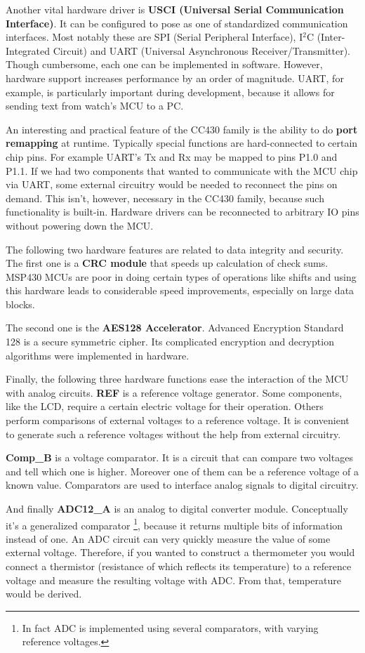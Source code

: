Another vital hardware driver is {\bf USCI (Universal Serial
Communication Interface)}. It can be configured to pose as one of
standardized communication interfaces. Most notably these are SPI
(Serial Peripheral Interface), I$^2$C (Inter-Integrated Circuit) and
UART (Universal Asynchronous Receiver/Transmitter). Though cumbersome,
each one can be implemented in software. However, hardware support
increases performance by an order of magnitude. UART, for example, is
particularly important during development, because it allows for sending
text from watch's MCU to a PC.

An interesting and practical feature of the CC430 family is the
ability to do {\bf port remapping} at runtime. Typically special
functions are hard-connected to certain chip pins. For example UART's
Tx and Rx may be mapped to pins P1.0 and P1.1. If we had two
components that wanted to communicate with the MCU chip via UART, some
external circuitry would be needed to reconnect the pins on demand.
This isn't, however, necessary in the CC430 family, because such
functionality is built-in. Hardware drivers can be reconnected to
arbitrary IO pins without powering down the MCU.

The following two hardware features are related to data integrity and
security. The first one is a {\bf CRC module} that speeds up
calculation of check sums.  MSP430 MCUs are poor in doing certain
types of operations like shifts and using this hardware leads to
considerable speed improvements, especially on large data blocks.

The second one is the {\bf AES128 Accelerator}. Advanced Encryption
Standard 128 is a secure symmetric cipher. Its complicated
encryption and decryption algorithms were implemented in hardware.

Finally, the following three hardware functions ease the interaction
of the MCU with analog circuits.  {\bf REF} is a reference voltage
generator. Some components, like the LCD, require a certain electric
voltage for their operation.  Others perform comparisons of external
voltages to a reference voltage. It is convenient to generate such a
reference voltages without the help from external circuitry.

{\bf Comp\_B} is a voltage comparator. It is a circuit that can
compare two voltages and tell which one is higher. Moreover one of
them can be a reference voltage of a known value. Comparators are used
to interface analog signals to digital circuitry.

And finally {\bf ADC12\_A} is an analog to digital converter
module. Conceptually it's a generalized comparator \footnote{In
fact ADC is implemented using several comparators, with varying
reference voltages.}, because it returns multiple bits of information
instead of one.  An ADC circuit can very quickly measure the value of
some external voltage. Therefore, if you wanted to construct a thermometer
you would connect a thermistor (resistance of which reflects its
temperature) to a reference voltage and measure the resulting
voltage with ADC. From that, temperature would be derived.

